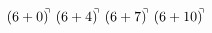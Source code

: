 \documentclass[preview]{standalone}
\begin{document}
\begin{align*}
(6+0)^{\hspace{-0.1cm}\urcorner} \ (6+4)^{\hspace{-0.1cm}\urcorner} \ (6+7)^{\hspace{-0.1cm}\urcorner} \ (6+10)^{\hspace{-0.1cm}\urcorner}
\end{align*}
\end{document}
